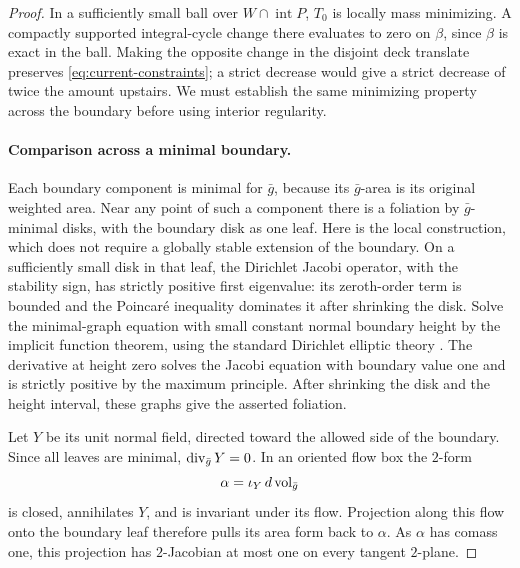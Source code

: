 \begin{proof}
In a sufficiently small ball over $W\cap\operatorname{int}P$, $T_0$
is locally mass minimizing. A compactly supported integral-cycle change
there evaluates to zero on $\beta$, since $\beta$ is exact in the ball.
Making the opposite change in the disjoint deck translate preserves
\eqref{eq:current-constraints}; a strict decrease would give a strict
decrease of twice the amount upstairs. We must establish the same
minimizing property across the boundary before using interior regularity.

\paragraph{Comparison across a minimal boundary.}
Each boundary component is minimal for $\bar g$, because its
$\bar g$-area is its original weighted area. Near any point of such a
component there is a foliation by $\bar g$-minimal disks, with the
boundary disk as one leaf. Here is the local construction, which does
not require a globally stable extension of the boundary. On a sufficiently
small disk in that leaf, the Dirichlet Jacobi operator, with the stability
sign, has strictly positive first eigenvalue: its zeroth-order term is
bounded and the Poincar\'e inequality dominates it after shrinking the
disk. Solve the minimal-graph equation with small constant normal boundary
height by the implicit function theorem, using the standard Dirichlet
elliptic theory \cite{GilbargTrudinger2001}. The derivative at height zero
solves the Jacobi equation with boundary value one and is strictly
positive by the maximum principle. After shrinking the disk and the
height interval, these graphs give the asserted foliation.

Let $Y$ be its unit normal field, directed toward the allowed side of
the boundary. Since all leaves are minimal,
$\operatorname{div}_{\bar g}Y=0$. In an oriented flow box the $2$-form
\[
\alpha=\iota_Y\,d\operatorname{vol}_{\bar g}
\]
is closed, annihilates $Y$, and is invariant under its flow. Projection
along this flow onto the boundary leaf therefore pulls its area form
back to $\alpha$. As $\alpha$ has comass one, this projection has
$2$-Jacobian at most one on every tangent $2$-plane.


\end{proof}
